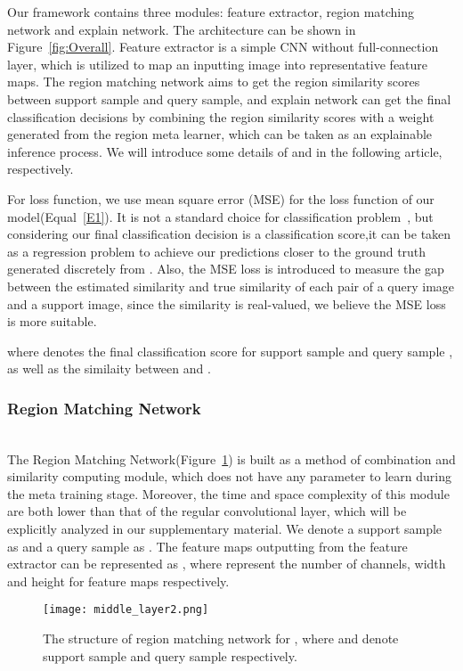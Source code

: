 \documentclass[letterpaper]{article}
\begin{document}
Our framework contains three modules: feature extractor, region matching network and explain network. The architecture can be shown in Figure~\ref{fig:Overall}. Feature extractor  is a simple CNN without full-connection layer, which is utilized to map an inputting image into representative feature maps. The region matching network  aims to get the region similarity scores between support sample and query sample, and explain network  can get the final classification decisions by combining the region similarity scores with a weight generated from the region meta learner, which can be taken as an explainable inference process. We will introduce some details of  and  in the following article, respectively. 

For loss function, we use mean square error (MSE) for the loss function of our model(Equal~\ref{E1}). It is not a standard choice for classification problem~\cite{sung2018learning}, but considering our final classification decision is a classification score,it can be taken as a regression problem to achieve our predictions closer to the ground truth generated discretely from . Also, the MSE loss is introduced to measure the gap between the estimated similarity and true similarity of each pair of a query image and a support image, since the similarity is real-valued, we believe the MSE loss is more suitable.


where  denotes the final classification score for support sample  and query sample , as well as the similaity between  and .
\subsubsection{Region Matching Network}\label{subsubsection:matching}
~\\
The Region Matching Network(Figure~\ref{fig:middle}) is built as a method of combination and similarity computing module, which does not have any parameter to learn during the meta training stage. Moreover, the time and space complexity of this module are both lower than that of the regular convolutional layer, which will be explicitly analyzed in our supplementary material. We denote a support sample as  and a query sample as . The feature maps outputting from the feature extractor  can be represented as , where  represent the number of channels, width and height for feature maps  respectively. 
\begin{figure}
    \centering
    \texttt{[image: middle\_layer2.png]}
    \caption{The structure of region matching network for , where  and  denote support sample and query sample respectively.}
    \label{fig:middle}
\end{figure}
\end{document}
